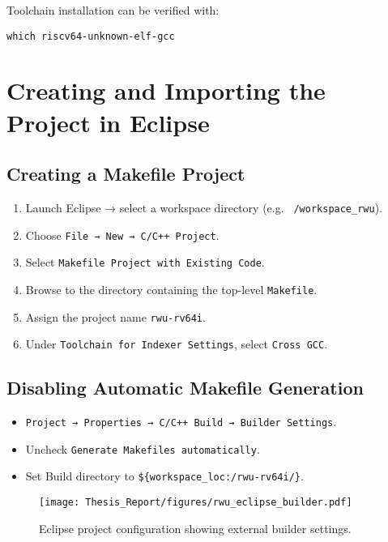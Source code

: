 Toolchain installation can be verified with:
\begin{verbatim}
which riscv64-unknown-elf-gcc
\end{verbatim}

\section{Creating and Importing the Project in Eclipse}
\subsection{Creating a Makefile Project}
\begin{enumerate}
  \item Launch Eclipse → select a workspace directory (e.g. \texttt{~/workspace\_rwu}).
  \item Choose \texttt{File → New → C/C++ Project}.
  \item Select \texttt{Makefile Project with Existing Code}.
  \item Browse to the directory containing the top-level \texttt{Makefile}.
  \item Assign the project name \texttt{rwu-rv64i}.
  \item Under \texttt{Toolchain for Indexer Settings}, select \texttt{Cross GCC}.
\end{enumerate}

\subsection{Disabling Automatic Makefile Generation}
\begin{itemize}
  \item \texttt{Project → Properties → C/C++ Build → Builder Settings}.
  \item Uncheck \texttt{Generate Makefiles automatically}.
  \item Set Build directory to \texttt{\$\{workspace\_loc:/rwu-rv64i/\}}.
\end{itemize}

\begin{figure}[H]
  \centering
  \texttt{[image: Thesis\_Report/figures/rwu\_eclipse\_builder.pdf]}
  \caption{Eclipse project configuration showing external builder settings.}
  \label{fig:rwu_eclipse_builder}
\end{figure}
